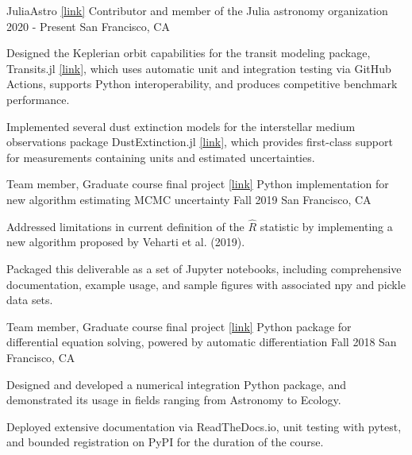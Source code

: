 
\begin{cventries}

\cventry
    {JuliaAstro \href{https://juliaastro.github.io/dev/index.html}{[link]}} %
    {Contributor and member of the Julia astronomy organization} %
    {2020 - Present} %
    {San Francisco, CA} %
    {
      \begin{cvitems} %
        \item Designed the Keplerian orbit capabilities for the transit modeling package, Transits.jl \href{https://juliaastro.github.io/Transits.jl/dev/}{[link]}, which uses automatic unit and integration testing via GitHub Actions, supports Python interoperability, and produces competitive benchmark performance.
        \item Implemented several dust extinction models for the interstellar medium observations package DustExtinction.jl \href{https://juliaastro.github.io/DustExtinction.jl/stable/}{[link]}, which provides first-class support for measurements containing units and estimated uncertainties.
      \end{cvitems}
    }
  
\cventry
    {Team member, Graduate course final project \href{https://github.com/icweaver/pyhat}{[link]}} %
    {Python implementation for new algorithm estimating MCMC uncertainty} %
    {Fall 2019} %
    {San Francisco, CA} %
    {
      \begin{cvitems} %
        \item Addressed limitations in current definition of the $\hat R$ statistic by implementing a new algorithm proposed by Veharti et al. (2019).
        \item Packaged this deliverable as a set of Jupyter notebooks, including comprehensive documentation, example usage, and sample figures with associated npy and pickle data sets.
      \end{cvitems}
    }
    
\cventry
    {Team member, Graduate course final project \href{https://spacejam.readthedocs.io/en/latest/}{[link]}} %
    {Python package for differential equation solving, powered by automatic differentiation} %
    {Fall 2018} %
    {San Francisco, CA} %
    {
      \begin{cvitems} %
         \item Designed and developed a numerical integration Python package, and demonstrated its usage in fields ranging from Astronomy to Ecology.
        \item Deployed extensive documentation via ReadTheDocs.io, unit testing with pytest, and bounded registration on PyPI for the duration of the course.
      \end{cvitems}
    }
    
\end{cventries}